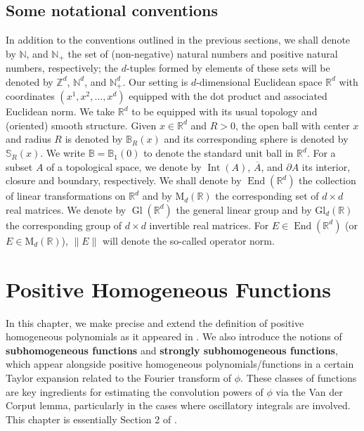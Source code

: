 \documentclass[11pt, letter]{book}
\newcommand\MdR{\mbox{M}_d(\mathbb{R})} %
\newcommand\End{\operatorname{End}} %
\newcommand\GldR{\mbox{Gl}_d(\mathbb{R})}%
\newcommand\Gl{\operatorname{Gl}} %
\newcommand\Interior{\operatorname{Int}}
\begin{document}
\section{Some notational conventions}
In addition to the conventions outlined in the previous sections, we shall denote by $\mathbb{N}$, and $\mathbb{N}_+$ the set of (non-negative) natural numbers and positive natural numbers, respectively; the $d$-tuples formed by elements of these sets will be denoted by $\mathbb{Z}^d$, $\mathbb{N}^d$, and $\mathbb{N}_+^d$. 
Our setting is $d$-dimensional Euclidean space $\mathbb{R}^d$ with coordinates $(x^1,x^2,\dots,x^d)$ equipped with the dot product and associated Euclidean norm. We take $\mathbb{R}^d$ to be equipped with its usual topology and (oriented) smooth structure. Given $x\in\mathbb{R}^d$ and $R>0$, the open ball with center $x$ and radius $R$ is denoted by $\mathbb{B}_R(x)$ and its corresponding sphere is denoted by $\mathbb{S}_R(x)$. We write $\mathbb{B}=\mathbb{B}_1(0)$ to denote the standard unit ball in $\mathbb{R}^d$. For a subset $A$ of a topological space, we denote by $\Interior{(A)}$, $\overline{A}$, and $\partial A$ its interior, closure and boundary, respectively. We shall denote by $\End(\mathbb{R}^d)$ the collection of linear transformations on $\mathbb{R}^d$ and by $\MdR$ the corresponding set of $d\times d$ real matrices. We denote by $\Gl(\mathbb{R}^d)$ the general linear group and by $\GldR$ the corresponding group of $d\times d$ invertible real matrices. For $E\in \End(\mathbb{R}^d)$ (or $E\in\MdR$), $\|E\|$ will denote the so-called operator norm.










\chapter{Positive Homogeneous Functions}\label{chap:pos-hom-fns}

In this chapter, we make precise and extend the definition of positive homogeneous polynomials as it appeared in \cite{randles_convolution_2017}. We also introduce the notions of \textbf{subhomogeneous functions} and \textbf{strongly subhomogeneous functions}, which appear alongside positive homogeneous polynomials/functions in a certain Taylor expansion related to the Fourier transform of $\phi$. These classes of functions are key ingredients for estimating the convolution powers of $\phi$ via the Van der Corput lemma, particularly in the cases where oscillatory integrals are involved. This chapter is essentially Section 2 of \cite{bui2021generalized}.\\
\end{document}
